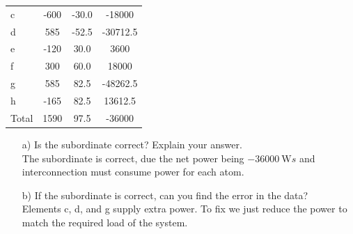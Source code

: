 \documentclass[a4paper]{article}
\begin{document}
\begin{itemize}
\begin{tabular}{l c c c}
	      	c       & -600                 & -30.0                  & -18000                                              \\
	      	d       & 585                  & -52.5                  & -30712.5                                            \\
	      	e       & -120                 & 30.0                   & 3600                                                \\
	      	f       & 300                  & 60.0                   & 18000                                               \\
	      	g       & 585                  & 82.5                   & -48262.5                                            \\
	      	h       & -165                 & 82.5                   & 13612.5                                             \\
	      	Total   & 1590                 & 97.5                   & -36000                                              
	      \end{tabular}	  
	      \begin{itemize}
	      	\item[a)] Is the subordinate correct? Explain your answer. \\
	      	      The subordinate is correct, due the net power being $\SI{-36000}{\watt}s$ and interconnection must consume power for each atom.
	      	\item[b)] If the subordinate is correct, can you find the error in the data?  \\
	      	      Elements c, d, and g supply extra power. To fix we just reduce the power to match the required load of the system.
	      \end{itemize}    	      	      	      	      	      	      	      	      	      	      	      	      	      	      	      	      	      	      	      	      	      	      	      	      	      	      	      	      
\end{itemize}
\end{document}
